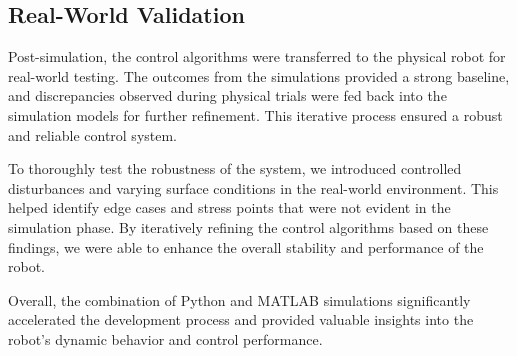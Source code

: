 \subsection{Real-World Validation}
Post-simulation, the control algorithms were transferred to the physical robot for real-world testing. The outcomes from the simulations provided a strong baseline, and discrepancies observed during physical trials were fed back into the simulation models for further refinement. This iterative process ensured a robust and reliable control system.

To thoroughly test the robustness of the system, we introduced controlled disturbances and varying surface conditions in the real-world environment. This helped identify edge cases and stress points that were not evident in the simulation phase. By iteratively refining the control algorithms based on these findings, we were able to enhance the overall stability and performance of the robot.

Overall, the combination of Python and MATLAB simulations significantly accelerated the development process and provided valuable insights into the robot's dynamic behavior and control performance.

